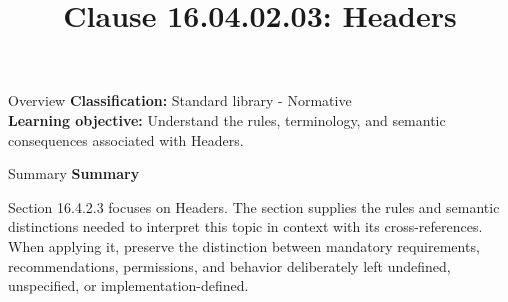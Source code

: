 \documentclass[10pt,letterpaper]{article}
\title{Clause 16.04.02.03: Headers}
\author{}
\date{}
\begin{document}
\maketitle
\begin{CornellOverviewBox}{Overview}
\textbf{Classification:} Standard library - Normative\\[2pt]
\textbf{Learning objective:} Understand the rules, terminology, and semantic consequences associated with Headers.
\end{CornellOverviewBox}\begin{CornellSummaryBox}{Summary}
{\sffamily\bfseries\color{Accent} Summary}\par\vspace{3pt}Section 16.4.2.3 focuses on Headers. The section supplies the rules and semantic distinctions needed to interpret this topic in context with its cross-references. When applying it, preserve the distinction between mandatory requirements, recommendations, permissions, and behavior deliberately left undefined, unspecified, or implementation-defined.
\end{CornellSummaryBox}
\end{document}
